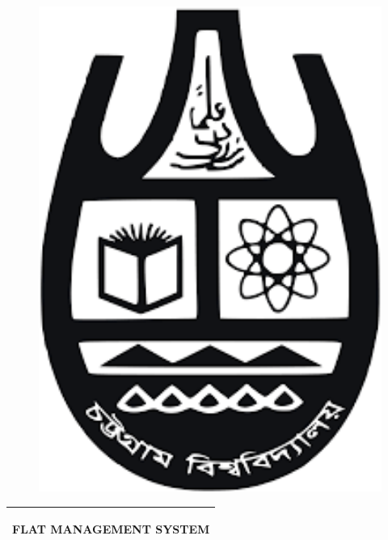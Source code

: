 \begin{titlepage}

\begin{figure}
	\centering
	\begin{minipage}[b]{0.15\textwidth}
		\includegraphics[width=1\textwidth]{images/cu}
	\end{minipage} \hfill
	\end{figure}
	
\noindent%
  \begin{tabular}{@{}p{\textwidth}@{}}
    \hline
    \hline
    \vspace{0.2cm}
    \begin{center}
    \Huge{\textbf{
      FLAT MANAGEMENT SYSTEM %
    }}
    \end{center}
    \vspace{0.2cm}\\
    \hline
    \hline
  \end{tabular}
  \vspace{4 cm}


\end{titlepage}
